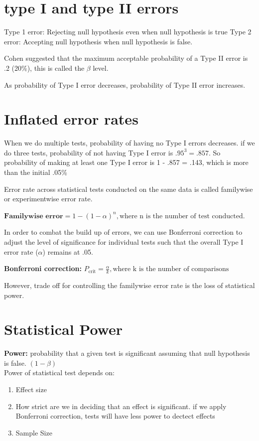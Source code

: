 \section{type I and type II errors}
Type 1 error: Rejecting null hypothesis even when null hypothesis is true
Type 2 error: Accepting null hypothesis when null hypothesis is false.

Cohen suggested that the maximum acceptable probability of a Type II error is .2 (20\%), this is called the $\beta$ level.

As probability of Type I error decreases, probability of Type II error increases.

\section{Inflated error rates}
When we do multiple tests, probability of having no Type I errors decreases.
if we do three tests, probability of not having Type I error is $.95^3 = .857$. So probability of making at least one Type I error is 1 - .857 = .143, which is more than the initial .05\%

Error rate across statistical tests conducted on the same data is called familywise or experimentwise error rate.
\begin{center}
$\textbf{Familywise error} = 1 - (1-\alpha)^n, \text{where n is the number of test conducted.}$
\end{center}

In order to combat the build up of errors, we can use Bonferroni correction to adjust the level of significance for individual tests such that the overall Type I error rate ($\alpha$) remains at .05. 

\begin{center}
\textbf{Bonferroni correction:} $P_{\text{crit}} = \frac{\alpha}{k}, \text{where k is the number of comparisons}$
\end{center}

However, trade off for controlling the familywise error rate is the loss of statistical power.

\section{Statistical Power}
\textbf{Power:} probability that a given test is significant assuming that null hypothesis is false. $(1-\beta)$\\
Power of statistical test depends on:
\begin{enumerate}
	\item Effect size
	\item How strict are we in deciding that an effect is significant. if we apply Bonferroni correction, tests will have less power to dectect effects
	\item Sample Size
\end{enumerate}

